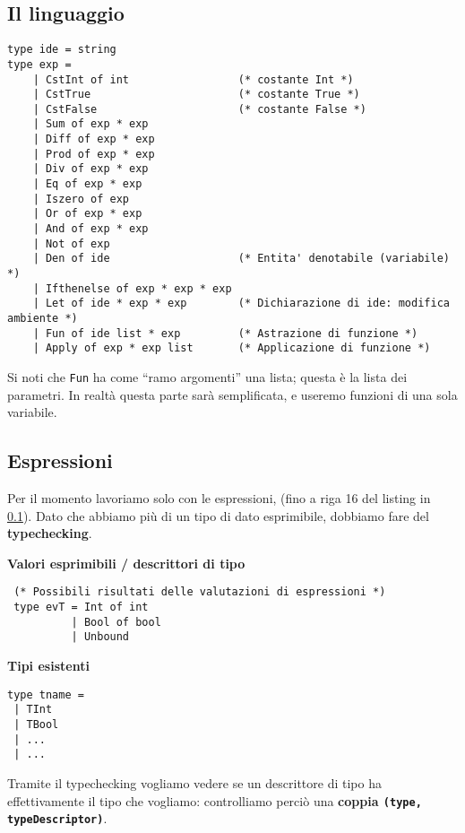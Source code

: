 \documentclass[a4paper,10pt]{article}
\begin{document}
\subsection{Il linguaggio}
\label{il_ling}
\begin{lstlisting}
type ide = string
type exp =
    | CstInt of int                 (* costante Int *)
    | CstTrue                       (* costante True *)
    | CstFalse                      (* costante False *)
    | Sum of exp * exp
    | Diff of exp * exp
    | Prod of exp * exp
    | Div of exp * exp
    | Eq of exp * exp
    | Iszero of exp
    | Or of exp * exp
    | And of exp * exp
    | Not of exp
    | Den of ide                    (* Entita' denotabile (variabile) *)
    | Ifthenelse of exp * exp * exp
    | Let of ide * exp * exp        (* Dichiarazione di ide: modifica ambiente *)
    | Fun of ide list * exp         (* Astrazione di funzione *)
    | Apply of exp * exp list       (* Applicazione di funzione *)
\end{lstlisting}

Si noti che \texttt{Fun} ha come ``ramo argomenti'' una lista; questa è la lista dei parametri. In realtà questa parte sarà semplificata, e useremo funzioni di una sola variabile.\smallskip
\newpage

\subsection{Espressioni}

Per il momento lavoriamo solo con le espressioni, (fino a riga 16 del listing in \ref{il_ling}). Dato che abbiamo più di un tipo di dato esprimibile, dobbiamo fare del \textbf{typechecking}.
\setlength\columnsep{20pt}
\begin{multicols}{2}
\textbf{Valori esprimibili / descrittori di tipo}
\begin{lstlisting}
 (* Possibili risultati delle valutazioni di espressioni *)
 type evT = Int of int
          | Bool of bool
          | Unbound
\end{lstlisting}

\textbf{Tipi esistenti}
\begin{lstlisting}
type tname = 
 | TInt
 | TBool
 | ...
 | ...
\end{lstlisting}

\end{multicols}

Tramite il typechecking vogliamo vedere se un descrittore di tipo ha effettivamente il tipo che vogliamo: controlliamo perciò una \textbf{coppia \texttt{(type, typeDescriptor)}}.\smallskip
\end{document}
